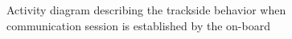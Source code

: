 \documentclass{template/openetcs_report}
\begin{document}
\begin{figure}
  \centering
  \caption{Activity diagram describing the trackside behavior when communication session is established by the on-board}
  \label{fig:Consider_trackside_comm_session_establishedd}
\end{figure}








\end{document}
